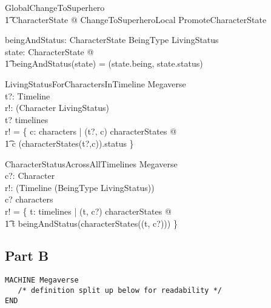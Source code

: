 \documentclass{article}
\begin{document}
\begin{zed}
GlobalChangeToSuperhero  \\
\t1 \exists \Delta CharacterState @ ChangeToSuperheroLocal \land PromoteCharacterState \\
\end{zed}

\begin{axdef}
beingAndStatus: CharacterState \fun BeingType \cross LivingStatus \\
\where
\forall state: CharacterState @ \\
\t1 beingAndStatus(state) = (state.being, state.status) \\
\end{axdef}

\begin{schema}{LivingStatusForCharactersInTimeline}
\Xi Megaverse \\
t?: Timeline \\ 
r!: \power (Character \cross LivingStatus) \\
\where 
t? \in timelines \\
r! = \{ c: characters | (t?, c) \in \dom characterStates @ \\
\t1 c \mapsto (characterStates(t?,c)).status
\} \\ 
\end{schema}

\begin{schema}{CharacterStatusAcrossAllTimelines}
\Xi Megaverse \\
c?: Character \\ 
r!: \power (Timeline \cross (BeingType \cross LivingStatus)) \\
\where 
c? \in characters \\
r! = \{ t: timelines | (t, c?) \in \dom characterStates @  \\
\t1 t \mapsto beingAndStatus(characterStates((t, c?)))   
\} \\ 
\end{schema}

\pagebreak

\subsection*{Part B}

\begin{verbatim}
MACHINE Megaverse
   /* definition split up below for readability */
END
\end{verbatim}
\end{document}
